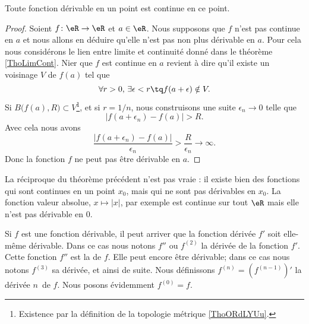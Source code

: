 \begin{theorem} \label{THOooFFOZooCYGets}
	Toute fonction dérivable en un point est continue en ce point.
\end{theorem}

\begin{proof}
	Soient \( f\colon \eR\to \eR\) et \( a\in \eR\). Nous supposons que \( f\) n'est pas continue en \( a\) et nous allons en déduire qu'elle n'est pas non plus dérivable en \( a\). Pour cela nous considérons le lien entre limite et continuité donné dans le théorème \ref{ThoLimCont}. Nier que \( f\) est continue en \( a\) revient à dire qu'il existe un voisinage \( V\) de \( f(a)\) tel que
	\begin{equation}
		\forall r>0,\,\exists \epsilon<r \tq f(a+\epsilon)\notin V.
	\end{equation}
	Si \( B\big( f(a),R \big)\subset V\)\footnote{Existence par la définition de la topologie métrique \ref{ThoORdLYUu}.}, et si \( r=1/n\), nous construisons une suite \( \epsilon_n\to 0\) telle que
	\begin{equation}
		| f(a+\epsilon_n)-f(a) |>R.
	\end{equation}
	Avec cela nous avons
	\begin{equation}
		\frac{ | f(a+\epsilon_n)-f(a) | }{ \epsilon_n }>\frac{ R }{ \epsilon_n }\to \infty.
	\end{equation}
	Donc la fonction \( f\) ne peut pas être dérivable en \( a\).
\end{proof}

\begin{remark}
	La réciproque du théorème précédent n'est pas vraie : il existe bien des fonctions qui sont continues en un point \( x_0\), mais qui ne sont pas dérivables en \( x_0\). La fonction valeur absolue, \( x\mapsto |x|\), par exemple est continue sur tout \( \eR\) mais elle n'est pas dérivable en \( 0\).
\end{remark}

Si \( f\) est une fonction dérivable, il peut arriver que la fonction dérivée \( f'\) soit elle-même dérivable. Dans ce cas nous notons \( f''\) ou \( f^{(2)}\) la dérivée de la fonction \( f'\). Cette fonction \( f''\) est la  de \( f\). Elle peut encore être dérivable; dans ce cas nous notons \( f^{(3)}\) sa dérivée, et ainsi de suite. Nous définissons \( f^{(n)}=(f^{(n-1)})'\) la dérivée \( n\)\ieme\ de \( f\). Nous posons évidemment \( f^{(0)}=f\).

